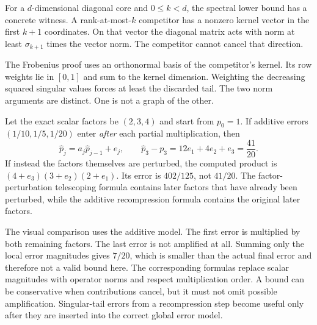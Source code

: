For a $d$-dimensional diagonal core and $0\le k<d$, the spectral lower bound has a concrete witness. A rank-at-most-$k$ competitor has a nonzero kernel vector in the first $k+1$ coordinates. On that vector the diagonal matrix acts with norm at least $\sigma_{k+1}$ times the vector norm. The competitor cannot cancel that direction.

The Frobenius proof uses an orthonormal basis of the competitor's kernel. Its row weights lie in $[0,1]$ and sum to the kernel dimension. Weighting the decreasing squared singular values forces at least the discarded tail. The two norm arguments are distinct. One is not a graph of the other.

Let the exact scalar factors be $(2,3,4)$ and start from $p_0=1$. If additive errors $(1/10,1/5,1/20)$ enter \emph{after} each partial multiplication, then
\[
\widehat p_j=a_j\widehat p_{j-1}+e_j,\qquad
\widehat p_3-p_3=12e_1+4e_2+e_3=\frac{41}{20}.
\]
If instead the factors themselves are perturbed, the computed product is $(4+e_3)(3+e_2)(2+e_1)$. Its error is $402/125$, not $41/20$. The factor-perturbation telescoping formula contains later factors that have already been perturbed, while the additive recompression formula contains the original later factors.

The visual comparison uses the additive model. The first error is multiplied by both remaining factors. The last error is not amplified at all. Summing only the local error magnitudes gives $7/20$, which is smaller than the actual final error and therefore not a valid bound here.
The corresponding formulas replace scalar magnitudes with operator norms and respect multiplication order. A bound can be conservative when contributions cancel, but it must not omit possible amplification. Singular-tail errors from a recompression step become useful only after they are inserted into the correct global error model.

